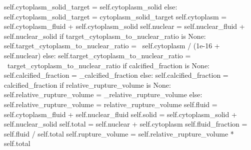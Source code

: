 \begin{python}
        self.cytoplasm_solid_target = self.cytoplasm_solid
    else:
        self.cytoplasm_solid_target = cytoplasm_solid_target
    self.cytoplasm = self.cytoplasm_fluid + self.cytoplasm_solid
    self.nuclear = self.nuclear_fluid + self.nuclear_solid
    if target_cytoplasm_to_nuclear_ratio is None:
        self.target_cytoplasm_to_nuclear_ratio = \ 
            self.cytoplasm / (1e-16 + self.nuclear)
    else:
        self.target_cytoplasm_to_nuclear_ratio = \ 
            target_cytoplasm_to_nuclear_ratio
    if calcified_fraction is None:
        self.calcified_fraction = _calcified_fraction
    else:
        self.calcified_fraction = calcified_fraction
    if relative_rupture_volume is None:
        self.relative_rupture_volume = _relative_rupture_volume
    else:
        self.relative_rupture_volume = relative_rupture_volume
    self.fluid = self.cytoplasm_fluid + self.nuclear_fluid
    self.solid = self.cytoplasm_solid + self.nuclear_solid
    self.total = self.nuclear + self.cytoplasm
    self.fluid_fraction = self.fluid / self.total
    self.rupture_volume = self.relative_rupture_volume * self.total
\end{python}
